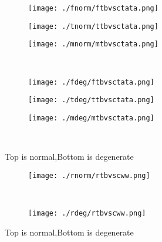 \documentclass[aps,floats,floatfix,nofootinbib]{revtex4-1}
\begin{document}
\begin{center}
\begin{figure}
\begin{subfigure}{0.3\textwidth}
\texttt{[image: ./fnorm/ftbvsctata.png]}
\label{}
\end{subfigure}
\begin{subfigure}{0.3\textwidth}
\texttt{[image: ./tnorm/ttbvsctata.png]}
\label{}
\end{subfigure}
\begin{subfigure}{0.3\textwidth}
\texttt{[image: ./mnorm/mtbvsctata.png]}
\label{}
\end{subfigure}\\
\begin{subfigure}{0.3\textwidth}
\texttt{[image: ./fdeg/ftbvsctata.png]}
\label{}
\end{subfigure}
\begin{subfigure}{0.3\textwidth}
\texttt{[image: ./tdeg/ttbvsctata.png]}
\label{}
\end{subfigure}
\begin{subfigure}{0.3\textwidth}
\texttt{[image: ./mdeg/mtbvsctata.png]}
\label{}
\end{subfigure}\\
\caption{Top is normal,Bottom is degenerate}
\end{figure}
\end{center}

\begin{center}
\begin{figure}
\begin{subfigure}{1.0\textwidth}
\texttt{[image: ./rnorm/rtbvscww.png]}
\label{}
\end{subfigure}\\
\begin{subfigure}{1.0\textwidth}
\texttt{[image: ./rdeg/rtbvscww.png]}
\label{}
\end{subfigure}
\caption{Top is normal,Bottom is degenerate}
\end{figure}
\end{center}
\end{document}
